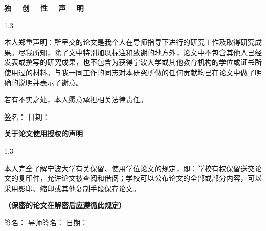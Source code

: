 \newpage

\makebox[1em][s]{\ \hfill}

\vspace{1.0em}

\begin{center}
      \bfseries
    独 \ \ 创 \ \ 性 \ \ 声 \ \ 明
\end{center}
    

\vspace{1.5em}

\begin{spacing}{1.3}

    本人郑重声明：所呈交的论文是我个人在导师指导下进行的研究工作及取得研究成果。尽我所知，除了文中特别加以标注和致谢的地方外，论文中不包含其他人已经发表或撰写的研究成果，也不包含为获得宁波大学或其他教育机构的学位或证书所使用过的材料。与我一同工作的同志对本研究所做的任何贡献均已在论文中做了明确的说明并表示了谢意。
      
    若有不实之处，本人愿意承担相关法律责任。

\end{spacing}

\vspace{2.4em}


\begin{center}
    签名：\underline{\hspace{7em}} \quad 日期：\underline{\hspace{7em}}

    
\end{center}
  
\vspace{10ex} 

\begin{center}
      \bfseries
    关于论文使用授权的声明
\end{center}
    

\vspace{1.5em}

\begin{spacing}{1.3}

    本人完全了解宁波大学有关保留、使用学位论文的规定，即：学校有权保留送交论文的复印件，允许论文被查阅和借阅；学校可以公布论文的全部或部分内容，可以采用影印、缩印或其他复制手段保存论文。
      
    \bfseries （保密的论文在解密后应遵循此规定）

\end{spacing}

\vspace{2.4em}


\begin{center}
    签名：\underline{\hspace{5em}} \quad 导师签名：\underline{\hspace{5em}} \quad 日期：\underline{\hspace{5em}}

    
\end{center}

